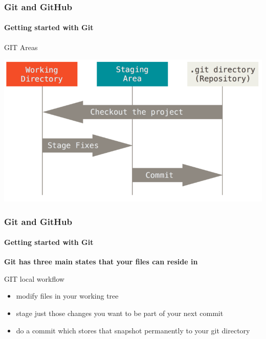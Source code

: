 \begin{frame}
    \frametitle{Git and GitHub}
    \framesubtitle{Getting started with Git}
    \addtocounter{nframe}{1}
    
    \begin{block}{GIT Areas}
        \begin{center}

            \includegraphics[width=.7\textwidth]{imgs/git-areas.png}
    
        \end{center}
    
    \end{block}
    

\end{frame}

\begin{frame}
    \frametitle{Git and GitHub}
    \framesubtitle{Getting started with Git}
    \addtocounter{nframe}{1}
    
    \textbf{Git has three main states that your files can reside in}

    \begin{block}{GIT local workflow}
       \begin{itemize}
           \item modify files in your working tree
           \item stage just those changes you want to be part of your next commit 
           \item do a commit which stores that snapshot permanently to your git directory
       \end{itemize}
    
    \end{block}

\end{frame}
